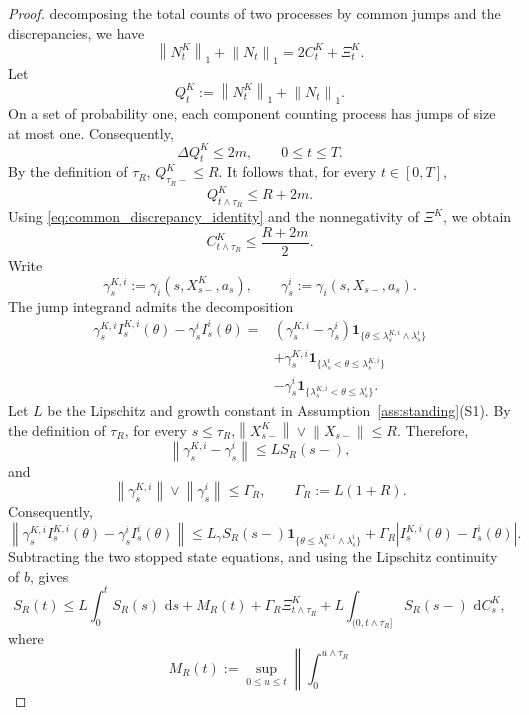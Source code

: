 \documentclass[11pt]{article}
\theoremstyle{remarkitalic}
\theoremstyle{remarkitalic}
\newcommand{\dd}{\,\mathrm d}
\newcommand{\1}{\mathbf 1}
\newcommand{\norm}[1]{\left\lVert #1 \right\rVert}
\begin{document}
{\begin{proof}
decomposing the total counts of two processes by common jumps and the discrepancies, we have
\begin{equation}
\label{eq:common_discrepancy_identity}
\norm{N_t^K}_1+\norm{N_t}_1
=
2C_t^K+\Xi_t^K.
\end{equation} Let
\[
    Q_t^K:=\norm{N_t^K}_1+\norm{N_t}_1.
\]
On a set of probability one, each component counting process has
jumps of size at most one. Consequently,
\[
    \Delta Q_t^K\leq 2m,
    \qquad 0\leq t\leq T.
\]
By the definition of $\tau_R$, $Q_{\tau_R-}^K\leq R$.
It follows that, for every $t\in[0,T]$,
\[
    Q_{t\wedge\tau_R}^K\leq R+2m.
\]
Using \eqref{eq:common_discrepancy_identity} and the nonnegativity of
$\Xi^K$, we obtain
\begin{equation}
\label{eq:stopped_common_count_bound}
C_{t\wedge\tau_R}^K
\leq
\frac{R+2m}{2}.
\end{equation} Write
\[
\gamma_s^{K,i}
:=
\gamma_i(s,X_{s-}^K,a_s),
\qquad
\gamma_s^i
:=
\gamma_i(s,X_{s-},a_s).
\]
The jump integrand admits the decomposition
\[
\begin{aligned}
\gamma_s^{K,i}I_s^{K,i}(\theta)
-
\gamma_s^iI_s^i(\theta)
={}&
\left(
    \gamma_s^{K,i}-\gamma_s^i
\right)
\mathbf 1_{\{
    \theta\leq
    \lambda_s^{K,i}\wedge\lambda_s^i
\}}
\\
&+
\gamma_s^{K,i}
\mathbf 1_{\{
    \lambda_s^i<\theta\leq\lambda_s^{K,i}
\}}
\\
&-
\gamma_s^i
\mathbf 1_{\{
    \lambda_s^{K,i}<\theta\leq\lambda_s^i
\}}.
\end{aligned}
\] Let $L$ be the Lipschitz and growth constant in
Assumption~\ref{ass:standing}(S1). By the definition of
$\tau_R$, for every $s\leq\tau_R$,$\norm{X_{s-}^K}\vee\norm{X_{s-}}\leq R$.
Therefore,
\[
\norm{\gamma_s^{K,i}-\gamma_s^i}
\leq
L S_R(s-),
\]
and
\[
\norm{\gamma_s^{K,i}}
\vee
\norm{\gamma_s^i}
\leq
\Gamma_R,
\qquad
\Gamma_R:=L(1+R).
\]
Consequently,
\[
\norm{
\gamma_s^{K,i}I_s^{K,i}(\theta)
-
\gamma_s^iI_s^i(\theta)
}\leq
L_\gamma S_R(s-)
\mathbf 1_{\{
    \theta\leq
    \lambda_s^{K,i}\wedge\lambda_s^i
\}}
+
\Gamma_R
\left|
    I_s^{K,i}(\theta)-I_s^i(\theta)
\right|.
\] Subtracting the two stopped state equations, and using the Lipschitz
continuity of $b$, gives
\begin{equation}
\label{eq:stopped_state_pathwise}
S_R(t)
\leq{}
L\int_0^tS_R(s)\,\dd s
+
M_R(t)
+
\Gamma_R\Xi_{t\wedge\tau_R}^K+
L
\int_{(0,t\wedge\tau_R]}
S_R(s-)\,\dd C_s^K,
\end{equation}
where
\[
M_R(t)
:=
\sup_{0\leq u\leq t}
\left\|
\int_0^{u\wedge\tau_R}
\]
\end{proof}}
\end{document}
